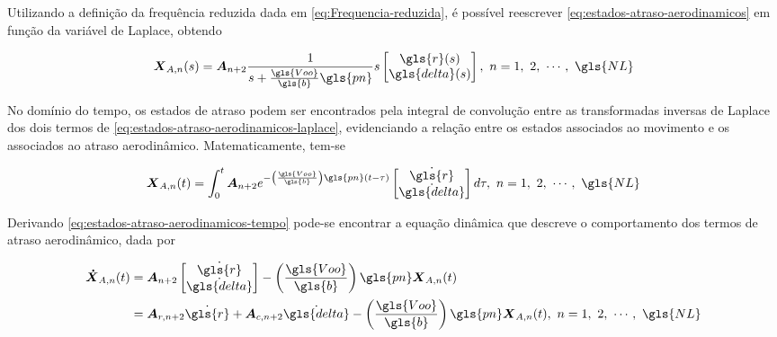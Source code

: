 Utilizando a definição da frequência reduzida dada em \eqref{eq:Frequencia-reduzida}, é possível reescrever \eqref{eq:estados-atraso-aerodinamicos} em função da variável de Laplace, obtendo

\begin{equation}\label{eq:estados-atraso-aerodinamicos-laplace}
    \boldsymbol{X}_{A,n}(s) = \boldsymbol{A}_{n+2}\frac{1}{s+\frac{\gls{Voo}}{\gls{b}}\gls{pn}}
    s\begin{bmatrix}
        \gls{r}(s) \\ \gls{delta}(s)
    \end{bmatrix}, \ n = 1,\ 2,\ \cdots,\ \gls{NL} 
\end{equation}

No domínio do tempo, os estados de atraso podem ser encontrados pela integral de convolução entre as transformadas inversas de Laplace dos dois termos de \eqref{eq:estados-atraso-aerodinamicos-laplace}, evidenciando a relação entre os estados associados ao movimento e os associados ao atraso aerodinâmico. Matematicamente, tem-se

\begin{equation}\label{eq:estados-atraso-aerodinamicos-tempo}
    \boldsymbol{X}_{A,n}(t) = \int_{0}^{t} \boldsymbol{A}_{n+2}e^{-\left(\frac{\gls{Voo}}{\gls{b}}\right)\gls{pn}(t-\tau)} \begin{bmatrix}
        \dot{\gls{r}} \\ \dot{\gls{delta}}
    \end{bmatrix}  d\tau, \ n = 1,\ 2,\ \cdots,\ \gls{NL} 
\end{equation}

Derivando \eqref{eq:estados-atraso-aerodinamicos-tempo} pode-se encontrar a equação dinâmica que descreve o comportamento dos termos de atraso aerodinâmico, dada por 

\begin{align}\label{eq:estados-atraso-aerodinamicos-derivada}
\begin{split}
    \boldsymbol{\dot{X}}_{A,n}(t) & = \boldsymbol{A}_{n+2} \begin{bmatrix}
        \dot{\gls{r}} \\ \dot{\gls{delta}}
    \end{bmatrix} - \left(\frac{\gls{Voo}}{\gls{b}}\right)\gls{pn}\boldsymbol{X}_{A,n}(t) \\
    & = \boldsymbol{A}_{r,n+2}\dot{\gls{r}} + \boldsymbol{A}_{c,n+2}\dot{\gls{delta}} - \left(\frac{\gls{Voo}}{\gls{b}}\right)\gls{pn}\boldsymbol{X}_{A,n}(t), \ n = 1,\ 2,\ \cdots,\ \gls{NL} 
\end{split}
\end{align}

